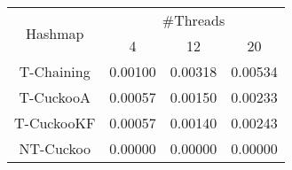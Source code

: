 \begin{tabular}{|c|c|c|c|}
\hline
\multirow{2}{*}{Hashmap} & \multicolumn{3}{c|}{\#Threads}\\\cline{2-4}& 4 & 12 & 20\\
\hline
\hline
T-Chaining & 0.00100 & 0.00318 & 0.00534\\
T-CuckooA & 0.00057 & 0.00150 & 0.00233\\
T-CuckooKF & 0.00057 & 0.00140 & 0.00243\\
NT-Cuckoo & 0.00000 & 0.00000 & 0.00000\\
\hline
\end{tabular}
